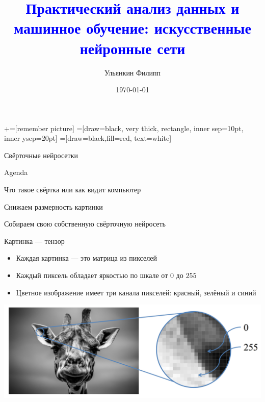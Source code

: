 \documentclass[notes,12pt, aspectratio=169]{beamer}
\title[]{\textcolor{blue}{Практический анализ данных и машинное обучение: искусственные нейронные сети}}
\author{Ульянкин Филипп}
\date{\today}
\newenvironment{wideitemize}{\itemize\addtolength{\itemsep}{10pt}}{\enditemize}
\begin{document}
\newcommand\marktopleft[1]{%
    \tikz[overlay,remember picture] 
        \node (marker-#1-a) at (-.3em,.3em) {};%
}
\newcommand\markbottomright[2]{%
    \tikz[overlay,remember picture] 
        \node (marker-#1-b) at (0em,0em) {};%
}
+=[remember picture] 
 =[draw=black, very thick, rectangle, inner sep=10pt, inner ysep=20pt]
 =[draw=black,fill=red, text=white]

\begin{frame}
\maketitle
\centering Свёрточные нейросетки
\end{frame}



\begin{frame}{Agenda}
\begin{wideitemize}

\item Что такое свёртка или как видит компьютер 

\item Снижаем размерность картинки 

\item Собираем свою собственную свёрточную нейросеть

\end{wideitemize} 
\end{frame}


\begin{frame}{Картинка — тензор}
\begin{itemize}
	\item Каждая картинка — это матрица из пикселей
	
	\item Каждый пиксель обладает яркостью по шкале от $0$ до $255$ 
	
	\item Цветное изображение имеет три канала пикселей: красный, зелёный и синий
	
\end{itemize}

\begin{center}
	\includegraphics[width=.7\linewidth]{pixels.png}
\end{center}
\end{frame}
\end{document}
